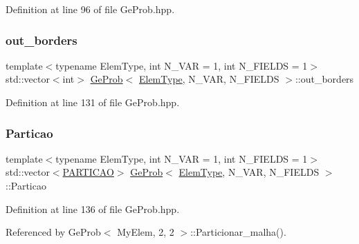 Definition at line 96 of file Ge\+Prob.\+hpp.

\mbox{\label{classGeProb_a2ac12ca16e62807fd3c69d97bf665336}} 
\subsubsection{\texorpdfstring{out\+\_\+borders}{out\_borders}}
{\footnotesize\ttfamily template$<$typename Elem\+Type, int N\+\_\+\+V\+AR = 1, int N\+\_\+\+F\+I\+E\+L\+DS = 1$>$ \\
std\+::vector$<$int$>$ \hyperlink{classGeProb}{Ge\+Prob}$<$ \hyperlink{spectral_8h_aaa2c1a7b2d1b12c590d730fe6ac839fa}{Elem\+Type}, N\+\_\+\+V\+AR, N\+\_\+\+F\+I\+E\+L\+DS $>$\+::out\+\_\+borders\hspace{0.3cm}{\ttfamily [protected]}}



Definition at line 131 of file Ge\+Prob.\+hpp.

\mbox{\label{classGeProb_a39012a295f18016463a00946affc3818}} 
\subsubsection{\texorpdfstring{Particao}{Particao}}
{\footnotesize\ttfamily template$<$typename Elem\+Type, int N\+\_\+\+V\+AR = 1, int N\+\_\+\+F\+I\+E\+L\+DS = 1$>$ \\
std\+::vector$<$\hyperlink{structPARTICAO}{P\+A\+R\+T\+I\+C\+AO}$>$ \hyperlink{classGeProb}{Ge\+Prob}$<$ \hyperlink{spectral_8h_aaa2c1a7b2d1b12c590d730fe6ac839fa}{Elem\+Type}, N\+\_\+\+V\+AR, N\+\_\+\+F\+I\+E\+L\+DS $>$\+::Particao\hspace{0.3cm}{\ttfamily [protected]}}



Definition at line 136 of file Ge\+Prob.\+hpp.



Referenced by Ge\+Prob$<$ My\+Elem, 2, 2 $>$\+::\+Particionar\+\_\+malha().

\mbox{\label{classGeProb_aecb008dc7914d62933407aecbcbbae0a}} 
